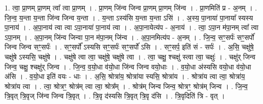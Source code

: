 \documentclass[17pt]{extarticle}
\begin{document}
1. त्वा॒ प्रा॒णम् प्रा॒णम् त्वा᳚ त्वा प्रा॒णम् । . प्रा॒णम् जि॑न्व जिन्व प्रा॒णम् प्रा॒णम् जि॑न्व । . प्रा॒णमिति॑ प्र - अ॒नम् । . जि॒न्व॒ य॒न्ता य॒न्ता जि॑न्व जिन्व य॒न्ता । . य॒न्ता ऽस्य॑सि य॒न्ता य॒न्ता ऽसि॑ । . अ॒स्य॒ पा॒नाया॑ पा॒नाया᳚ स्यस्य पा॒नाय॑ । . अ॒पा॒नाय॑ त्वा त्वा ऽपा॒नाया॑ पा॒नाय॑ त्वा । . अ॒पा॒नायेत्य॑प - अ॒नाय॑ । . त्वा॒ ऽपा॒न म॑पा॒नम् त्वा᳚ त्वा ऽपा॒नम् । . अ॒पा॒नम् जि॑न्व जिन्वा पा॒न म॑पा॒नम् जि॑न्व । . अ॒पा॒नमित्य॑प - अ॒नम् । . जि॒न्व॒ सꣳ॒॒सर्पः॑ सꣳ॒॒सर्पो॑ जिन्व जिन्व सꣳ॒॒सर्पः॑ । . सꣳ॒॒सर्पो᳚ ऽस्यसि सꣳ॒॒सर्पः॑ सꣳ॒॒सर्पो॑ ऽसि । . सꣳ॒॒सर्प॒ इति॑ सं - सर्पः॑ । . अ॒सि॒ चक्षु॑षे॒ चक्षु॑षे ऽस्यसि॒ चक्षु॑षे । . चक्षु॑षे त्वा त्वा॒ चक्षु॑षे॒ चक्षु॑षे त्वा । . त्वा॒ चक्षु॒ श्चक्षु॑ स्त्वा त्वा॒ चक्षुः॑ । . चक्षु॑र् जिन्व जिन्व॒ चक्षु॒ श्चक्षु॑र् जिन्व । . जि॒न्व॒ व॒यो॒धा व॑यो॒धा जि॑न्व जिन्व वयो॒धाः । . व॒यो॒धा अ॑स्यसि वयो॒धा व॑यो॒धा अ॑सि । . व॒यो॒धा इति॑ वयः - धाः । . अ॒सि॒ श्रोत्रा॑य॒ श्रोत्रा॑या स्यसि॒ श्रोत्रा॑य । . श्रोत्रा॑य त्वा त्वा॒ श्रोत्रा॑य॒ श्रोत्रा॑य त्वा । . त्वा॒ श्रोत्रꣳ॒॒ श्रोत्र॑म् त्वा त्वा॒ श्रोत्र᳚म् । . श्रोत्र॑म् जिन्व जिन्व॒ श्रोत्रꣳ॒॒ श्रोत्र॑म् जिन्व । . जि॒न्व॒ त्रि॒वृत् त्रि॒वृज् जि॑न्व जिन्व त्रि॒वृत् । . त्रि॒वृ द॑स्यसि त्रि॒वृत् त्रि॒वृ द॑सि । . त्रि॒वृदिति॑ त्रि - वृत् । \newline
\end{document}
